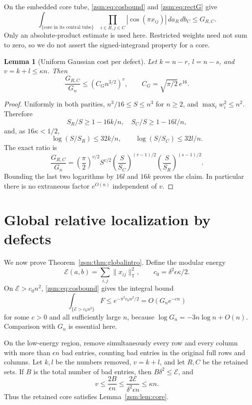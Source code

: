 \documentclass[11pt]{article}
\newtheorem{lemma}[theorem]{Lemma}
\theoremstyle{definition}\newtheorem{definition}[theorem]{Definition}
\theoremstyle{remark}\newtheorem{remark}[theorem]{Remark}
\newcommand{\T}{\mathbb T}
\newcommand{\normT}[1]{\lVert #1\rVert_{\T}}
\begin{document}
On the embedded core tube, \eqref{zsm:eq:cosbound} and \eqref{zsm:eq:rectG} give
\begin{equation}\label{zsm:eq:coreintegral}
 \int_{\{\text{core in its central tube}\}}
 \prod_{i\in R,j\in C}|\cos(\pi x_{ij})|\,da_R\,db_C\le G_{R,C}.
\end{equation}
Only an absolute-product estimate is used here. Restricted weights need not
sum to zero, so we do not assert the signed-integrand property for a core.

\begin{lemma}[Uniform Gaussian cost per defect]\label{zsm:lem:ratio}
Let $k=n-r$, $l=n-s$, and $v=k+l\le\kappa n$. Then
\begin{equation}\label{zsm:eq:coreratio}
 \frac{G_{R,C}}{G_n}\le(C_Gn^{3/2})^v,
 \qquad C_G=\sqrt{\pi/2}\,e^{16}.
\end{equation}
\end{lemma}
\begin{proof}
Uniformly in both parities, $n^3/16\le S\le n^3$ for $n\ge2$, and
$\max_iw_i^2\le n^2$. Therefore
\[
 S_R/S\ge1-16k/n,\quad S_C/S\ge1-16l/n,
\]
and, as $16\kappa<1/2$,
\[
 \log(S/S_R)\le32k/n,\qquad\log(S/S_C)\le32l/n.
\]
The exact ratio is
\[
 \frac{G_{R,C}}{G_n}=
 \left(\frac\pi2\right)^{v/2}S^{v/2}
 \left(\frac S{S_C}\right)^{(r-1)/2}
 \left(\frac S{S_R}\right)^{(s-1)/2}.
\]
Bounding the last two logarithms by $16l$ and $16k$ proves the claim.
In particular there is no extraneous factor $e^{O(n)}$ independent of $v$.
\end{proof}

\section{Global relative localization by defects}\label{zsm:sec:defects}
We now prove Theorem~\ref{zsm:thm:globalintro}. Define the modular energy
\[
 \mathcal E(a,b)=\sum_{i,j}\normT{x_{ij}}^2,
 \qquad c_0=\delta^2\epsilon\kappa/2.
\]
On $\mathcal E>c_0n^2$, \eqref{zsm:eq:cosbound} gives the integral bound
\begin{equation}\label{zsm:eq:highenergy}
 \int_{\{\mathcal E>c_0n^2\}}F\le e^{-\pi^2c_0n^2/2}
 =O(G_ne^{-cn})
\end{equation}
for some $c>0$ and all sufficiently large $n$, because
$\log G_n=-3n\log n+O(n)$. Comparison with $G_n$ is essential here.

On the low-energy region, remove simultaneously every row and every column
with more than $\epsilon n$ bad entries, counting bad entries in the original
full rows and columns. Let $k,l$ be the numbers removed, $v=k+l$, and let
$R,C$ be the retained sets. If $B$ is the total number of bad entries, then
$B\delta^2\le\mathcal E$, and
\begin{equation}\label{zsm:eq:defectnumber}
 v\le\frac{2B}{\epsilon n}
 \le\frac{2\mathcal E}{\delta^2\epsilon n}\le\kappa n.
\end{equation}
Thus the retained core satisfies Lemma~\ref{zsm:lem:core}.
\end{document}
